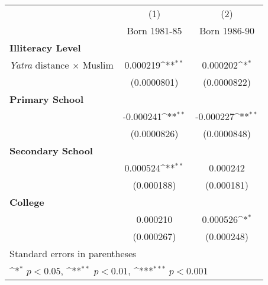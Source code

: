 {
\def\sym#1{\ifmmode^{#1}\else\(^{#1}\)\fi}
\begin{tabular}{l*{2}{c}}
\hline\hline
            &\multicolumn{1}{c}{(1)}&\multicolumn{1}{c}{(2)}\\
            &\multicolumn{1}{c}{Born 1981-85}&\multicolumn{1}{c}{Born 1986-90}\\
[1em]            
\hline
\textbf{Illiteracy Level} & & \\
[1em]
\textit{Yatra} distance $\times$ Muslim &    0.000219\sym{**} &    0.000202\sym{*}  \\
            &  (0.0000801)         & (0.0000822)         \\
[1em]
\hline
\textbf{Primary School} & & \\
[1em]
&   -0.000241\sym{**} &   -0.000227\sym{**} \\
& (0.0000826)         & (0.0000848)         \\
[1em]
\hline
\textbf{Secondary School} & & \\
[1em]
&    0.000524\sym{**} &    0.000242         \\
&  (0.000188)         &  (0.000181)         \\
[1em]
\hline
\textbf{College} & & \\
[1em]
&    0.000210 &   0.000526\sym{*}\\
&  (0.000267) &  (0.000248)\\
[1em]
\hline\hline
\multicolumn{3}{l}{\footnotesize Standard errors in parentheses}\\
\multicolumn{3}{l}{\footnotesize \sym{*} \(p<0.05\), \sym{**} \(p<0.01\), \sym{***} \(p<0.001\)}\\
\end{tabular}
}
